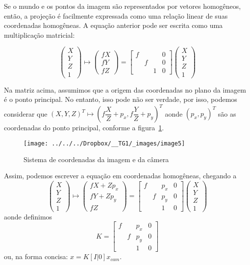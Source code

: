 \documentclass[ecp,tc]{iiufrgs}
\begin{document}
Se o mundo e os pontos da imagem são representados por vetores homogêneos, então, a projeção é facilmente expressada como uma relação linear de suas coordenadas homogêneas. A equação anterior pode ser escrita como uma multiplicação matricial:

\[\begin{pmatrix} X \\ Y \\ Z \\ 1 \end{pmatrix} \mapsto \begin{pmatrix} fX \\ fY \\ fZ \end{pmatrix} = \begin{bmatrix} f &  &  & 0 \\ & f & & 0 \\ & & 1 & 0 \end{bmatrix} \begin{pmatrix} X \\ Y \\ Z \\ 1 \end{pmatrix} \]

Na matriz acima, assumimos que a origem das coordenadas no plano da imagem é o ponto principal. No entanto, isso pode não ser verdade, por isso, podemos considerar que $ (X, Y, Z)^T \mapsto (f\dfrac{X}{Z} + p_x, f\dfrac{Y}{Z} + p_y)^T $ aonde $ (p_x, p_y)^T $ são as coordenadas do ponto principal, conforme a figura~\ref{fig:image5}.

\begin{figure}
	\centering
	\caption{Sistema de coordenadas da imagem e da câmera}
	\texttt{[image: ../../../Dropbox/\_\_TG1/\_images/image5]}
	\label{fig:image5}
\end{figure}

Assim, podemos escrever a equação em coordenadas homogêneas, chegando a
\[\begin{pmatrix} X \\ Y \\ Z \\ 1 \end{pmatrix} \mapsto \begin{pmatrix} fX+Zp_x \\ fY+Zp_y \\ fZ \end{pmatrix} = \begin{bmatrix} f &  & p_x & 0 \\ & f & p_y & 0 \\ & & 1 & 0 \end{bmatrix} \begin{pmatrix} X \\ Y \\ Z \\ 1 \end{pmatrix} \]
aonde definimos
\[K = \begin{bmatrix} f &  & p_x & 0 \\ & f & p_y & 0 \\ & & 1 & 0 \end{bmatrix}\]
ou, na forma concisa: $ x = K[I|0]x_{cam}$.
\end{document}

